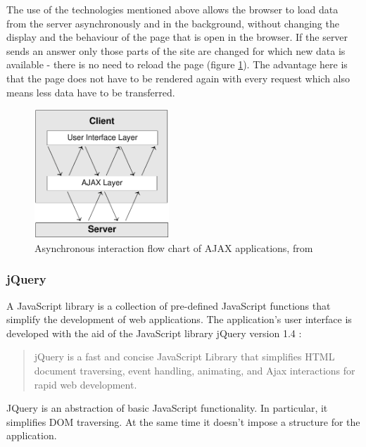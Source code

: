 The use of the technologies mentioned above allows the browser to load data from the server asynchronously and in the background, without changing the display and the behaviour of the page that is open in the browser. If the server sends an answer only those parts of the site are changed for which new data is available - there is no need to reload the page (figure \ref{fig:ajax-interaction-pattern}). The advantage here is that the page does not have to be rendered again with every request which also means less data have to be transferred.

\medskip
\begin{figure}[ht] 
 \begin{center}
   \includegraphics[width=0.45\textwidth]{grafik/ajax-ajax} 
 \end{center}
 \caption[Asynchronous interaction flow chart of AJAX applications]{Asynchronous interaction flow chart of AJAX applications, from }
 \label{fig:ajax-interaction-pattern} 
\end{figure}


\subsubsection{jQuery}

A JavaScript library is a collection of pre-defined JavaScript functions that simplify the development of web applications. The application's user interface is developed with the aid of the JavaScript library jQuery version 1.4 \cite{jquery:homepage}:

\begin{quote}
jQuery is a fast and concise JavaScript Library that simplifies HTML document traversing, event handling, animating, and Ajax interactions for rapid web development. \cite{jquery:homepage}
\end{quote}

JQuery is an abstraction of basic JavaScript functionality. In particular, it simplifies DOM traversing. At the same time it doesn't impose a structure for the application.


